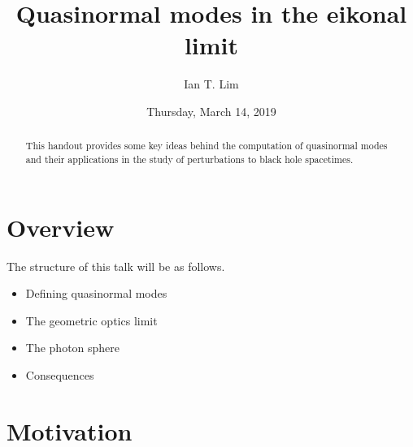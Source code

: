 \documentclass{tufte-handout}
\title{Quasinormal modes in the eikonal limit}
\author{Ian T. Lim}
\date{Thursday, March 14, 2019}
\newcommand{\?}{\overset{?}{=}}
\theoremstyle{definition}
\theoremstyle{remark}
\begin{document}
\maketitle

\begin{abstract}
\noindent This handout provides some key ideas behind the computation of quasinormal modes and their applications in the study of perturbations to black hole spacetimes.
\end{abstract}

\section{Overview}
The structure of this talk will be as follows.
\begin{itemize}
    \item Defining quasinormal modes
    \item The geometric optics limit
    \item The photon sphere
    \item Consequences
\end{itemize}
\section{Motivation}


\end{document}

